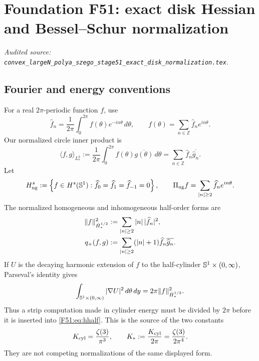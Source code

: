 \begingroup
\renewcommand{\qD}{q_{\mathbb D}^{0}}
\section{Foundation F51: exact disk Hessian and Bessel--Schur normalization}
\label{module:F51}
\noindent\textit{Audited source: \nolinkurl{convex_largeN_polya_szego_stage51_exact_disk_normalization.tex}.}
\subsection{Fourier and energy conventions}

For a real $2\pi$-periodic function $f$, use
\begin{equation}
 \widehat f_n=\frac1{2\pi}\int_0^{2\pi}f(\theta)e^{-in\theta}\,d\theta,
 \qquad
 f(\theta)=\sum_{n\in\mathbb Z}\widehat f_ne^{in\theta}.
\end{equation}
Our normalized circle inner product is
\begin{equation}\label{F51:eq:L2-star}
 \langle f,g\rangle_{L^2_*}
 :=\frac1{2\pi}\int_0^{2\pi}f(\theta)\overline{g(\theta)}\,d\theta
 =\sum_{n\in\mathbb Z}\widehat f_n\overline{\widehat g_n}.
\end{equation}
Let
\begin{equation}
 H_{\rm ng}^{s}
 :=\left\{f\in H^s(\mathbb S^1):
 \widehat f_0=\widehat f_1=\widehat f_{-1}=0\right\},
 \qquad
 \Pi_{\rm ng} f=\sum_{|n|\ge2}\widehat f_ne^{in\theta}.
\end{equation}
The normalized homogeneous and inhomogeneous half-order forms are
\begin{align}
 \|f\|_{\dot H^{1/2}_*}^2
 &:=\sum_{|n|\ge2}|n|\,|\widehat f_n|^2,\label{F51:eq:hhalf}\\
 q_+(f,g)
 &:=\sum_{|n|\ge2}(|n|+1)\widehat f_n\overline{\widehat g_n}.
 \label{F51:eq:qplus}
\end{align}
If $U$ is the decaying harmonic extension of $f$ to the half-cylinder
$\mathbb S^1\times(0,\infty)$, Parseval's identity gives
\begin{equation}\label{F51:eq:cylinder}
 \int_{\mathbb S^1\times(0,\infty)}|\nabla U|^2\,d\theta\,dy
 =2\pi\|f\|_{\dot H^{1/2}_*}^2.
\end{equation}
Thus a strip computation made in cylinder energy must be divided by $2\pi$
before it is inserted into \eqref{F51:eq:hhalf}.  This is the source of the two
constants
\begin{equation}\label{F51:eq:twoK}
 K_{\rm cyl}=\frac{\zeta(3)}{\pi^3},
 \qquad
 K_*:=\frac{K_{\rm cyl}}{2\pi}
 =\frac{\zeta(3)}{2\pi^4}.
\end{equation}
They are not competing normalizations of the same displayed form.

